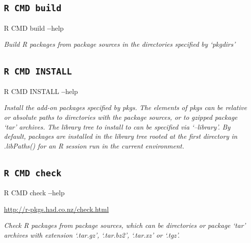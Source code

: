 \documentclass[]{book}
\newenvironment{Shaded}{\begin{snugshade}}{\end{snugshade}}
\newcommand{\OperatorTok}[1]{\textcolor[rgb]{0.81,0.36,0.00}{\textbf{#1}}}
\newcommand{\NormalTok}[1]{#1}
\theoremstyle{definition}
\theoremstyle{definition}
\theoremstyle{definition}
\theoremstyle{remark}
\begin{document}
\subsection{\texorpdfstring{\texttt{R\ CMD\ build}}{R CMD build}}\label{r-cmd-build}

\begin{Shaded}
\begin{Highlighting}[]
\NormalTok{R CMD build }\OperatorTok{--}\NormalTok{help}
\end{Highlighting}
\end{Shaded}

\emph{Build R packages from package sources in the directories specified
by `pkgdirs'}

\subsection{\texorpdfstring{\texttt{R\ CMD\ INSTALL}}{R CMD INSTALL}}\label{r-cmd-install}

\begin{Shaded}
\begin{Highlighting}[]
\NormalTok{R CMD INSTALL }\OperatorTok{--}\NormalTok{help}
\end{Highlighting}
\end{Shaded}

\emph{Install the add-on packages specified by pkgs. The elements of
pkgs can be relative or absolute paths to directories with the package
sources, or to gzipped package `tar' archives. The library tree to
install to can be specified via `--library'. By default, packages are
installed in the library tree rooted at the first directory in
.libPaths() for an R session run in the current environment.}

\subsection{\texorpdfstring{\texttt{R\ CMD\ check}}{R CMD check}}\label{r-cmd-check}

\begin{Shaded}
\begin{Highlighting}[]
\NormalTok{R CMD check }\OperatorTok{--}\NormalTok{help}
\end{Highlighting}
\end{Shaded}

\url{http://r-pkgs.had.co.nz/check.html}

\emph{Check R packages from package sources, which can be directories or
package `tar' archives with extension `.tar.gz', `.tar.bz2', `.tar.xz'
or `.tgz'.}
\end{document}
